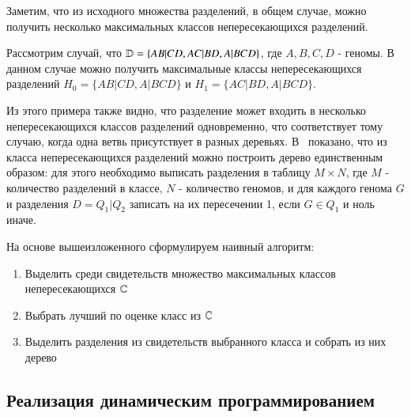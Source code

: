 Заметим, что из исходного множества разделений, в общем случае, можно получить несколько максимальных классов непересекающихся разделений.
\begin{example}
  Рассмотрим случай, что $\mathbb{D} = \{ AB|CD, AC|BD, A|BCD \}$, где $A, B, C, D$ - геномы.
  В данном случае можно получить максимальные классы непересекающихся разделений
  $H_0 = \{ AB|CD, A|BCD \}$ и $H_1 = \{ AC|BD, A|BCD \}$.
\end{example}
Из этого примера также видно, что разделение может входить в несколько непересекающихся классов разделений одновременно,
что соответствует тому случаю, когда одна ветвь присутствует в разных деревьях.
В~\cite{gusfield1991efficient} показано, что из класса непересекающихся разделений можно построить дерево единственным образом:
для этого необходимо выписать разделения в таблицу $M \times N$, где $M$ - количество разделений в классе, $N$ - количество геномов,
и для каждого генома $G$ и разделения $D = Q_1|Q_2$ записать на их пересечении 1, если $G \in Q_1$ и ноль иначе.

На основе вышеизложенного сформулируем наивный алгоритм:
\begin{enumerate}
  \item Выделить среди свидетельств множество максимальных классов непересекающихся $\mathbb{C}$
  \item Выбрать лучший по оценке класс из $\mathbb{C}$
  \item Выделить разделения из свидетельств выбранного класса и собрать из них дерево
\end{enumerate}

\subsection{Реализация динамическим программированием}

